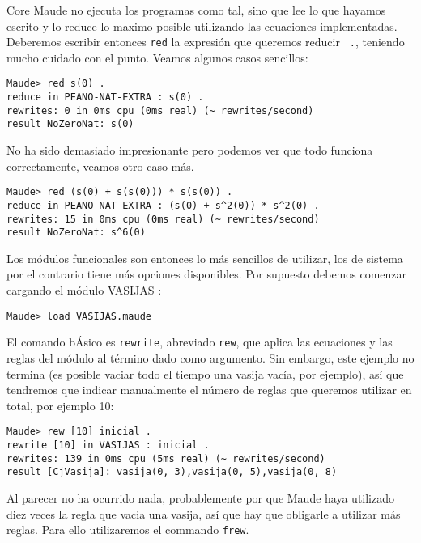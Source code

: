 Core Maude no ejecuta los programas como tal, sino que lee lo que hayamos escrito y lo reduce lo maximo posible utilizando las ecuaciones implementadas. Deberemos escribir entonces \texttt{red} la expresión que queremos reducir \verb" .", teniendo mucho cuidado con el punto. Veamos algunos casos sencillos:
{\codesize
\begin{verbatim}
Maude> red s(0) .
reduce in PEANO-NAT-EXTRA : s(0) .
rewrites: 0 in 0ms cpu (0ms real) (~ rewrites/second)
result NoZeroNat: s(0)
\end{verbatim}
}

No ha sido demasiado impresionante pero podemos ver que todo funciona correctamente, veamos otro caso más.\par

{\codesize
\begin{verbatim}
Maude> red (s(0) + s(s(0))) * s(s(0)) .
reduce in PEANO-NAT-EXTRA : (s(0) + s^2(0)) * s^2(0) .
rewrites: 15 in 0ms cpu (0ms real) (~ rewrites/second)
result NoZeroNat: s^6(0)
\end{verbatim}
}

Los módulos funcionales son entonces lo más sencillos de utilizar, los de sistema por el contrario tiene más opciones disponibles. Por supuesto debemos comenzar cargando el módulo VASIJAS :\par

{\codesize
\begin{verbatim}
Maude> load VASIJAS.maude
\end{verbatim}
}

El comando bÁsico es \texttt{rewrite}, abreviado \texttt{rew}, que aplica las ecuaciones y las reglas del módulo al término dado como argumento. Sin embargo, este ejemplo no termina (es posible vaciar todo el tiempo
una vasija vacía, por ejemplo), así que tendremos que indicar manualmente el número de reglas que queremos utilizar en total, por ejemplo 10:

{\codesize
\begin{verbatim}
Maude> rew [10] inicial .
rewrite [10] in VASIJAS : inicial .
rewrites: 139 in 0ms cpu (5ms real) (~ rewrites/second)
result [CjVasija]: vasija(0, 3),vasija(0, 5),vasija(0, 8)
\end{verbatim}
}

Al parecer no ha ocurrido nada, probablemente por que Maude haya utilizado diez veces la regla que vacia una vasija, así que hay que obligarle a utilizar más reglas. Para ello utilizaremos el commando \texttt{frew}.


